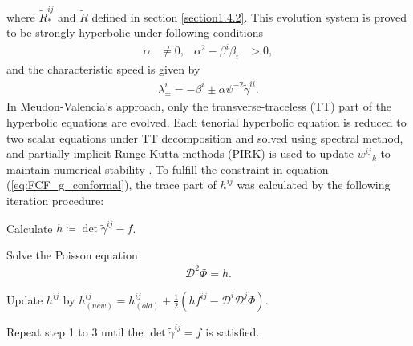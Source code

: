 where $\tilde{R}^{ij}_*$ and $\tilde{R}$ defined in section \ref{section1.4.2}.
This evolution system is proved to be strongly hyperbolic \cite{cordero2008mathematical} under following conditions
\begin{align}
    \alpha &\neq 0, & \alpha^2 - \beta^i \beta_i &> 0,
\end{align}
and the characteristic speed is given by
\begin{align}
    \lambda^i_{\pm} = -\beta^i \pm \alpha\psi^{-2} \tilde{\gamma}^{ii}.
\end{align}
In Meudon-Valencia's approach, only the transverse-traceless (TT) part of the hyperbolic equations are evolved.
Each tenorial hyperbolic equation is reduced to two scalar equations under TT decomposition \cite{bonazzola2004constrained} and solved using spectral method,
and partially implicit Runge-Kutta methods (PIRK) is used to update $w^{ij}{}_k$ to maintain numerical stability \cite{cordero2012gravitational,cordero2012partially}.
To fulfill the constraint in equation (\ref{eq:FCF_g_conformal}), the trace part of $h^{ij}$ was calculated by the following iteration procedure:
\begin{Step}
    \item Calculate $h\coloneqq \det{\tilde{\gamma}^{ij}} - f$.
    \item Solve the Poisson equation
    \begin{align}\label{eq:FCF_g_trace}
        \mathcal{D}^2 \Phi = h.
    \end{align}
    \item Update $h^{ij}$ by $h^{ij}_{(new)} = h^{ij}_{(old)} + \frac{1}{2} \left( h f^{ij} - \mathcal{D}^i \mathcal{D}^j \Phi \right)$.
    \item Repeat step 1 to 3 until the $\det{\tilde{\gamma}^{ij}} = f$ is satisfied.
\end{Step}

